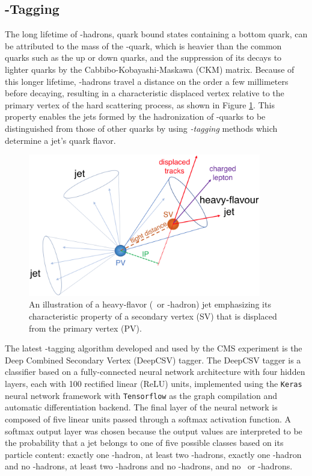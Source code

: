 \subsection{\qrkb-Tagging} \label{btagging}

The long lifetime of \qrkb-hadrons, quark bound states containing a bottom quark, can be attributed to the mass of the \qrkb-quark, which is heavier than the common quarks such as the up or down quarks, and the suppression of its decays to lighter quarks by the Cabbibo-Kobayashi-Maskawa (CKM) matrix. Because of this longer lifetime, \qrkb-hadrons travel a distance on the order a few millimeters before decaying, resulting in a characteristic displaced vertex relative to the primary vertex of the hard scattering process, as shown in Figure \ref{fig:secondary_vertex}. This property enables the jets formed by the hadronization of \qrkb-quarks to be distinguished from those of other quarks by using \textit{\qrkb-tagging} methods which determine a jet's quark flavor.

\begin{figure}[htbp]
  \centering
    \includegraphics[width=4in]{images/secondary_vertex}
    \caption[Illustration of a Heavy-Flavor Jet]{An illustration of a heavy-flavor (\qrkc\ or \qrkb-hadron) jet emphasizing its characteristic property of a secondary vertex (SV) that is displaced from the primary vertex (PV).\cite{CMSBTAG}}
    \label{fig:secondary_vertex}
\end{figure}

The latest \qrkb-tagging algorithm developed and used by the CMS experiment is the Deep Combined Secondary Vertex (DeepCSV)\cite{CMSBTAG} tagger. The DeepCSV tagger is a classifier based on a fully-connected neural network architecture with four hidden layers, each with 100 rectified linear (ReLU) units, implemented using the \texttt{Keras}\cite{KERAS} neural network framework with \texttt{Tensorflow}\cite{TENSORFLOW} as the graph compilation and automatic differentiation backend. The final layer of the neural network is composed of five linear units passed through a softmax activation function. A softmax output layer was chosen because the output values are interpreted to be the probability that a jet belongs to one of five possible classes based on its particle content: exactly one \qrkb-hadron, at least two \qrkb-hadrons, exactly one \qrkc-hadron and no \qrkb-hadrons, at least two \qrkc-hadrons and no \qrkb-hadrons, and no \qrkc\ or \qrkb-hadrons.

